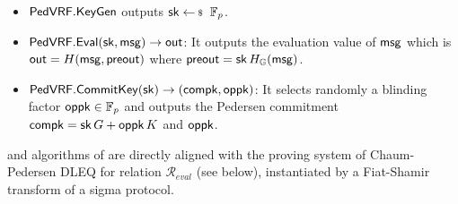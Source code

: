 \begin{itemize}
	\item ${\mathsf{PedVRF}}.{\mathsf{KeyGen}}$  outputs  $\sk \leftsample \F_p$. %
	\item ${\mathsf{PedVRF}}.{\mathsf{Eval}}(\mathsf{sk},\mathsf{msg}) \rightarrow {\ensuremath{\mathsf{out}}}$: It outputs the evaluation value of $ \mathsf{msg} $ which is $ {\mathsf{out}} = H(\mathsf{msg}, {\mathsf{preout}}) $  where ${\mathsf{preout}} = \mathsf{sk} \, H_{{\mathbb{G}}}(\mathsf{msg})$.



\item ${\mathsf{PedVRF}}.{\mathsf{CommitKey}}(\mathsf{sk}) \rightarrow (\mathsf{compk}, \mathsf{oppk}) $: It selects randomly a blinding factor $ \mathsf{oppk} \in \mathbb{F}_p $ and outputs the Pedersen commitment $ \mathsf{compk} =   \mathsf{sk} \, G + \mathsf{oppk} \, K$ and $ \mathsf{oppk} $.  
\end{itemize}

 \Sign and \Verify algorithms of \PedVRF are directly  aligned with the proving system of Chaum-Pedersen DLEQ for relation $\mathcal{R}_{eval}$ (see below),
instantiated by a Fiat-Shamir transform of a sigma protocol.





